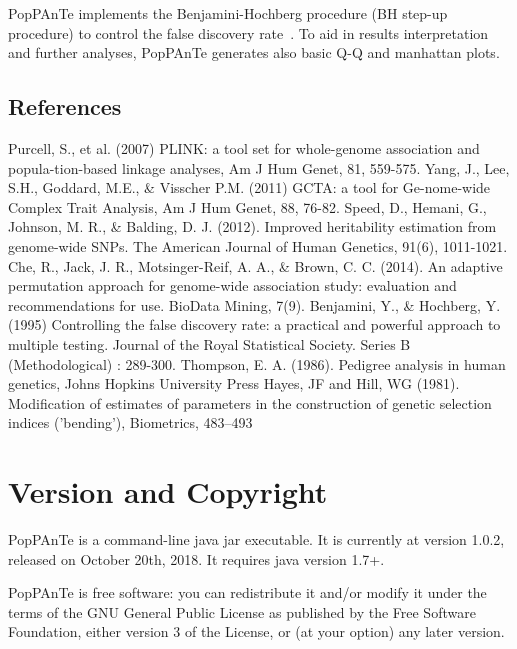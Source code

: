 \documentclass[a4paper,9pt]{article}
\begin{document}
\noindent
PopPAnTe implements the Benjamini-Hochberg procedure (BH step-up procedure) to control the false discovery rate~\cite{BH}. To aid in results interpretation and further analyses, PopPAnTe generates also basic Q-Q and manhattan plots.



\subsection*{References}
%
	\begin{itemize}
		 Purcell, S., et al. (2007) PLINK: a tool set for whole-genome association and popula-tion-based linkage analyses, Am J Hum Genet, 81, 559-575.
		 Yang, J., Lee, S.H., Goddard, M.E., \& Visscher P.M. (2011) GCTA: a tool for Ge-nome-wide Complex Trait Analysis,  Am J Hum Genet, 88, 76-82.
		 Speed, D., Hemani, G., Johnson, M. R., \& Balding, D. J. (2012). Improved heritability estimation from genome-wide SNPs. The American Journal of Human Genetics, 91(6), 1011-1021.
		 Che, R., Jack, J. R., Motsinger-Reif, A. A., \& Brown, C. C. (2014). An adaptive permutation approach for genome-wide association study: evaluation and recommendations for use. BioData Mining, 7(9).
		 Benjamini, Y., \& Hochberg, Y. (1995) Controlling the false discovery rate: a practical and powerful approach to multiple testing. Journal of the Royal Statistical Society. Series B (Methodological) : 289-300.
		 Thompson, E. A. (1986). Pedigree analysis in human genetics, Johns Hopkins University Press
		 Hayes, JF and Hill, WG (1981). Modification of estimates of parameters in the construction of genetic selection indices ('bending'), Biometrics, 483--493
	\end{itemize}


\newpage	

\section{Version and Copyright}

PopPAnTe is a command-line java jar executable. It is currently at version 1.0.2, released on October 20th, 2018. It requires java version 1.7+.


\vspace{0.3cm}

\noindent
PopPAnTe is free software: you can redistribute it and/or modify it under the terms of the GNU General Public License as published by the Free Software Foundation, either version 3 of the License, or (at your option) any later version.
\end{document}
